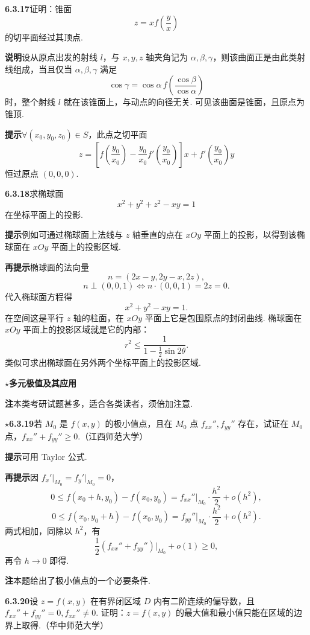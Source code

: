 \documentclass[UTF8, 12pt, fontset=fandol, oneside]{ctexart}
\begin{document}
\noindent\textbf{6.3.17}\quad 证明：锥面
\[
  z=xf\left(\frac{y}{x}\right)
\]
的切平面经过其顶点.

\noindent\textbf{说明}\quad 设从原点出发的射线 $l$，与 $x,y,z$ 轴夹角记为 $\alpha,\beta,\gamma$，则该曲面正是由此类射线组成，当且仅当 $\alpha,\beta,\gamma$ 满足
\[
  \cos\gamma=\cos\alpha\,f\left(\frac{\cos\beta}{\cos\alpha}\right)
\]
时，整个射线 $l$ 就在该锥面上，与动点的向径无关. 可见该曲面是锥面，且原点为锥顶.

\noindent\textbf{提示}\quad $\forall(x_0,y_0,z_0)\in S$，此点之切平面
\[
  z=\left[f\left(\frac{y_0}{x_0}\right)
  -\frac{y_0}{x_0}f'\left(\frac{y_0}{x_0}\right)\right]x
  +f'\left(\frac{y_0}{x_0}\right)y
\]
恒过原点 $(0,0,0)$.

\noindent\textbf{6.3.18}\quad 求椭球面
\[
  x^2+y^2+z^2-xy=1
\]
在坐标平面上的投影.

\noindent\textbf{提示}\quad 例如可通过椭球面上法线与 $z$ 轴垂直的点在 $xOy$ 平面上的投影，以得到该椭球面在 $xOy$ 平面上的投影区域.

\noindent\textbf{再提示}\quad 椭球面的法向量
\[
  n=(2x-y,2y-x,2z),
\]
\[
  n\perp(0,0,1)\Leftrightarrow n\cdot(0,0,1)=2z=0.
\]
代入椭球面方程得
\[
  x^2+y^2-xy=1.
\]
在空间这是平行 $z$ 轴的柱面，在 $xOy$ 平面上它是包围原点的封闭曲线. 椭球面在 $xOy$ 平面上的投影区域就是它的内部：
\[
  r^2\le\frac1{1-\frac12\sin2\theta}.
\]
类似可求出椭球面在另外两个坐标平面上的投影区域.

\noindent\textbf{\ensuremath{\star}多元极值及其应用}

\noindent\textbf{注}\quad 本类考研试题甚多，适合各类读者，须倍加注意.

\noindent\textbf{\ensuremath{\star}6.3.19}\quad 若 $M_0$ 是 $f(x,y)$ 的极小值点，且在 $M_0$ 点 $f_{xx}'',f_{yy}''$ 存在，试证在 $M_0$ 点，$f_{xx}''+f_{yy}''\ge0$.（江西师范大学）

\noindent\textbf{提示}\quad 可用 Taylor 公式.

\noindent\textbf{再提示}\quad 因 $f_x'\big|_{M_0}=f_y'\big|_{M_0}=0$，
\[
  0\le f(x_0+h,y_0)-f(x_0,y_0)
  =f_{xx}''\big|_{M_0}\cdot\frac{h^2}{2}+o(h^2),
\]
\[
  0\le f(x_0,y_0+h)-f(x_0,y_0)
  =f_{yy}''\big|_{M_0}\cdot\frac{h^2}{2}+o(h^2).
\]
两式相加，同除以 $h^2$，有
\[
  \frac12(f_{xx}''+f_{yy}'')\big|_{M_0}+o(1)\ge0,
\]
再令 $h\to0$ 即得.

\noindent\textbf{注}\quad 本题给出了极小值点的一个必要条件.

\noindent\textbf{6.3.20}\quad 设 $z=f(x,y)$ 在有界闭区域 $D$ 内有二阶连续的偏导数，且 $f_{xx}''+f_{yy}''=0,f_{xx}''\ne0$. 证明：$z=f(x,y)$ 的最大值和最小值只能在区域的边界上取得.（华中师范大学）
\end{document}
